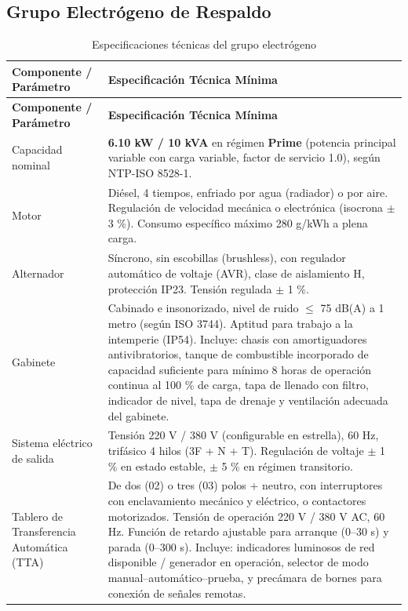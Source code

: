 \documentclass[12pt,a4paper]{article}
\begin{document}
\subsection{Grupo Electrógeno de Respaldo}

\begin{longtable}{L{4.5cm}p{10.5cm}}
  \caption{Especificaciones técnicas del grupo electrógeno}
  \label{tab:ge}\\
  \toprule
  \textbf{Componente / Parámetro} & \textbf{Especificación Técnica Mínima} \\
  \midrule
  \endfirsthead
  \toprule
  \textbf{Componente / Parámetro} & \textbf{Especificación Técnica Mínima} \\
  \midrule
  \endhead
  Capacidad nominal & \textbf{6.10 kW / 10 kVA} en régimen \textbf{Prime} (potencia principal variable con carga variable, factor de servicio 1.0), según NTP-ISO 8528-1. \\
  Motor & Diésel, 4 tiempos, enfriado por agua (radiador) o por aire. Regulación de velocidad mecánica o electrónica (isocrona $\pm$ 3 \%). Consumo específico máximo 280 g/kWh a plena carga. \\
  Alternador & Síncrono, sin escobillas (brushless), con regulador automático de voltaje (AVR), clase de aislamiento H, protección IP23. Tensión regulada $\pm$ 1 \%. \\
  Gabinete & Cabinado e insonorizado, nivel de ruido $\leq$ 75 dB(A) a 1 metro (según ISO 3744). Aptitud para trabajo a la intemperie (IP54). Incluye: chasis con amortiguadores antivibratorios, tanque de combustible incorporado de capacidad suficiente para mínimo 8 horas de operación continua al 100 \% de carga, tapa de llenado con filtro, indicador de nivel, tapa de drenaje y ventilación adecuada del gabinete. \\
  Sistema eléctrico de salida & Tensión 220 V / 380 V (configurable en estrella), 60 Hz, trifásico 4 hilos (3F + N + T). Regulación de voltaje $\pm$ 1 \% en estado estable, $\pm$ 5 \% en régimen transitorio. \\
  Tablero de Transferencia Automática (TTA) & De dos (02) o tres (03) polos + neutro, con interruptores con enclavamiento mecánico y eléctrico, o contactores motorizados. Tensión de operación 220 V / 380 V AC, 60 Hz. Función de retardo ajustable para arranque (0--30 s) y parada (0--300 s). Incluye: indicadores luminosos de red disponible / generador en operación, selector de modo manual--automático--prueba, y precámara de bornes para conexión de señales remotas. \\

\end{longtable}
\end{document}
